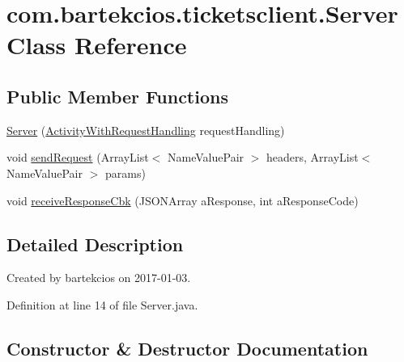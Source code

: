 \hypertarget{classcom_1_1bartekcios_1_1ticketsclient_1_1_server}{}\section{com.\+bartekcios.\+ticketsclient.\+Server Class Reference}
\label{classcom_1_1bartekcios_1_1ticketsclient_1_1_server}
\subsection*{Public Member Functions}
\begin{DoxyCompactItemize}
\item 
\hyperlink{classcom_1_1bartekcios_1_1ticketsclient_1_1_server_a0f8f0fb2582731358493674f9c2dc382}{Server} (\hyperlink{interfacecom_1_1bartekcios_1_1ticketsclient_1_1_activity_with_request_handling}{Activity\+With\+Request\+Handling} request\+Handling)
\item 
void \hyperlink{classcom_1_1bartekcios_1_1ticketsclient_1_1_server_ae467fe2cd2ad1ccf4e8e61ff9ba5ca42}{send\+Request} (Array\+List$<$ Name\+Value\+Pair $>$ headers, Array\+List$<$ Name\+Value\+Pair $>$ params)
\item 
void \hyperlink{classcom_1_1bartekcios_1_1ticketsclient_1_1_server_a937c61458ccddb090c991f93d38857bb}{receive\+Response\+Cbk} (J\+S\+O\+N\+Array a\+Response, int a\+Response\+Code)
\end{DoxyCompactItemize}


\subsection{Detailed Description}
Created by bartekcios on 2017-\/01-\/03. 

Definition at line 14 of file Server.\+java.



\subsection{Constructor \& Destructor Documentation}
\mbox{\label{classcom_1_1bartekcios_1_1ticketsclient_1_1_server_a0f8f0fb2582731358493674f9c2dc382}} 
